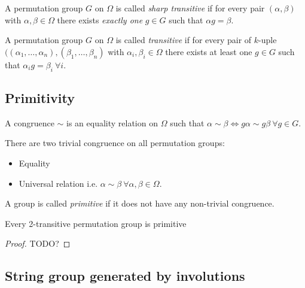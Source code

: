 \begin{definition}
  A permutation group $G$ on $\Omega$ is called \textit{sharp transitive} if for every pair $(\alpha, \beta)$ with $\alpha, \beta \in \Omega$ there exists \textit{exactly one} $g \in G$ such that $\alpha g = \beta$.
\end{definition}

\begin{definition}
  A permutation group $G$ on $\Omega$ is called \textit{transitive} if for every pair of $k$-uple $((\alpha_1, \dots, \alpha_n), (\beta_1, \dots, \beta_n)$ with $\alpha_i, \beta_i \in \Omega$ there exists at least one $g \in G$ such that $\alpha_i g = \beta_i \  \forall i$.
\end{definition}

\subsection{Primitivity}

\begin{definition}[Congruence]
  A congruence $\sim$ is an equality relation on $\Omega$ such that $\alpha \sim \beta \Leftrightarrow g\alpha \sim g\beta \ \forall g \in G$.
\end{definition}

There are two trivial congruence on all permutation groups:
\begin{itemize}
  \item Equality
  \item Universal relation i.e. $\alpha \sim \beta \ \forall \alpha, \beta \in \Omega$.
\end{itemize}

\begin{definition}
  A group is called \textit{primitive} if it does not have any non-trivial congruence.
\end{definition}

\begin{property}
  Every 2-transitive permutation group is primitive
\end{property}

\begin{proof}
  TODO?
\end{proof}

\subsection{String group generated by involutions}

